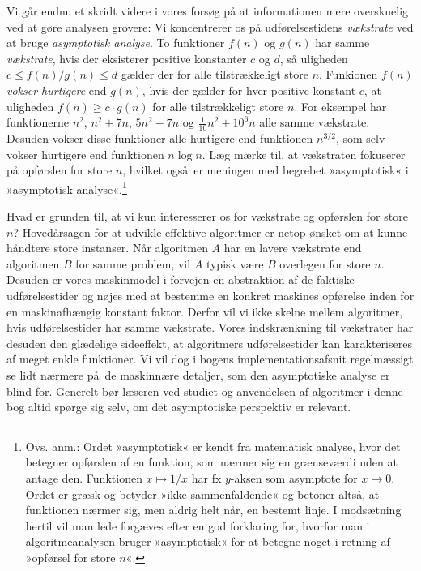 Vi går endnu et skridt videre i vores forsøg på at informationen mere overskuelig ved at gøre analysen grovere:
Vi koncentrerer os på udførelsestidens \emph{vækstrate} ved at bruge \emph{asymptotisk analyse}.
To funktioner $f(n)$ og $g(n)$ har samme 
\emph{vækstrate}, hvis der eksisterer positive konstanter $c$ og $d$, så uligheden $c\le f(n)/g(n)\le d$ gælder der for alle tilstrækkeligt store $n$.
Funkionen $f(n)$ \emph{vokser hurtigere} end $g(n)$, hvis der gælder for hver positive konstant $c$, at uligheden $f(n)\ge c\cdot g(n)$ for alle tilstrækkeligt store $n$.
For eksempel har funktionerne $n^2$, $n^2 + 7n$, $5n^2 - 7n$ og
$\frac{1}{10}n^2 + 10^6 n$ alle samme vækstrate.
Desuden vokser disse funktioner alle hurtigere end funktionen $n^{3/2}$, som selv vokser hurtigere end funktionen  $n \log n$.
Læg mærke til, at vækstraten fokuserer på opførslen for store $n$, hvilket også er meningen med begrebet »asymptotisk« i »asymptotisk analyse«.\footnote{Ovs. anm.:
Ordet »asymptotisk« er kendt fra matematisk analyse, hvor det betegner opførslen af en funktion, som nærmer sig en grænseværdi uden at antage den.
Funktionen $x\mapsto 1/x$ har fx $y$-aksen som asymptote for $x\rightarrow 0$.
Ordet er græsk og betyder »ikke-sammenfaldende« og betoner altså, at funktionen nærmer sig, men aldrig helt når, en bestemt linje.
I modsætning hertil vil man lede forgæves efter en god forklaring for, hvorfor man i algoritmeanalysen bruger »asymptotisk« for at betegne noget i retning af »opførsel for store $n$«.}

Hvad er grunden til, at vi kun interesserer os for vækstrate og opførslen for store $n$?
Hovedårsagen for at udvikle effektive algoritmer er netop ønsket om at kunne håndtere store instanser.
Når algoritmen $A$ har en lavere vækstrate end algoritmen $B$ for samme problem, vil $A$ typisk være $B$ overlegen for store $n$.
Desuden er vores maskinmodel 
i forvejen en abstraktion af de faktiske udførelsestider og nøjes med at bestemme en konkret maskines opførelse inden for en maskinafhængig konstant faktor.
Derfor vil vi ikke skelne mellem algoritmer, hvis udførelsestider har samme vækstrate.
Vores indskrænkning til vækstrater har desuden den glædelige sideeffekt, at algoritmers udførelsestider kan karakteriseres af meget enkle funktioner.
Vi vil dog i bogens implementationsafsnit regelmæssigt se lidt nærmere på de maskinnære detaljer, som den asymptotiske analyse er blind for. 
Generelt bør læseren ved studiet og anvendelsen af algoritmer i denne bog altid spørge sig selv, om det asymptotiske perspektiv er relevant.

